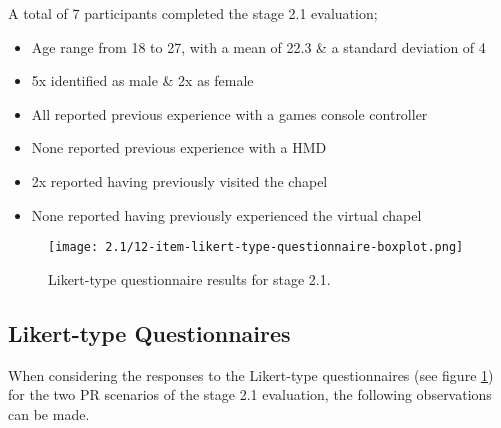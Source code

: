 A total of 7 participants completed the stage 2.1 evaluation;
\begin{itemize}
	\item Age range from 18 to 27, with a mean of 22.3 \& a standard deviation of 4
	\item 5x identified as male \& 2x as female
	\item All reported previous experience with a games console controller
	\item None reported previous experience with a HMD
	\item 2x reported having previously visited the chapel
	\item None reported having previously experienced the virtual chapel
\end{itemize}


\begin{figure}[h]
	\begin{center}
	\texttt{[image: 2.1/12-item-likert-type-questionnaire-boxplot.png]}
	\caption{Likert-type questionnaire results for stage 2.1.}
	\label{2-1-12-item-likert-type-questionnaire-boxplot.png}
	\end{center}
\end{figure}


\subsection{Likert-type Questionnaires}

When considering the responses to the Likert-type questionnaires (see figure \ref{2-1-12-item-likert-type-questionnaire-boxplot.png}) for the two PR scenarios of the stage 2.1 evaluation, the following observations can be made.


